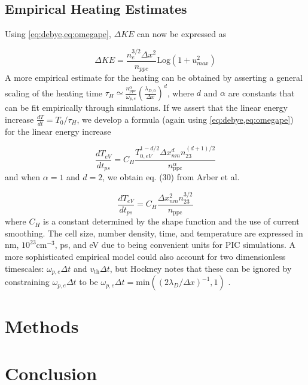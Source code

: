 \subsection{Empirical Heating Estimates}

Using \cref{eq:debye,eq:omegape}, $\Delta KE$ can now be expressed as 

\begin{equation}
	\Delta KE = \frac{n_e^{3/2} \Delta x^2}{n_{ppc}} \text{Log}(1 + u_{max}^2) \label{eq:logarber}
\end{equation}
A more empirical estimate for the heating can be obtained by asserting a general scaling of the heating time $\tau_H \simeq \frac{n_\text{ppc}^\alpha}{\omega_{p,e}} \left(\frac{\lambda_{D,0}}{\Delta x}\right)^d$, where $d$ and $\alpha$ are constants that can be fit empirically through simulations. If we assert that the linear energy increase $\frac{dT}{dt} = T_0 / \tau_H$, we develop a formula (again using \cref{eq:debye,eq:omegape}) for the linear energy increase 

\begin{equation}
	\frac{dT_{eV}}{dt_{ps}} = C_H \frac{T_{0,eV}^{1 - d/2} \Delta x_{nm}^d n_{23}^{(d + 1)/2}}{n_\text{ppc}^\alpha} \label{eq:generalizedarber}
\end{equation}
and when $\alpha = 1$ and $d = 2$, we obtain eq. (30) from Arber et al. \cite{Arber_2015_PPCF}

\begin{equation}
	\frac{dT_{eV}}{dt_{ps}} = C_H \frac{\Delta x_{nm}^2 n_{23}^{3/2}}{n_\text{ppc}} \label{eq:arber}
\end{equation}
where $C_H$ is a constant determined by the shape function and the use of current smoothing. The cell size, number density, time, and temperature are expressed in nm, $10^{23} \text{cm}^{-3}$, ps, and eV due to being convenient units for PIC simulations. A more sophisticated empirical model could also account for two dimensionless timescales: $\omega_{p, e} \Delta t$ and $v_\text{th} \Delta t$, but Hockney \cite{Hockney_1971_JoCP} notes that these can be ignored by constraining $\omega_{p,e} \Delta t$ to be $\omega_{p,e} \Delta t = \text{min}((2 \lambda_D / \Delta x)^{-1}, 1)$ \cite{Hockney_1971_JoCP}.

\section{Methods}

\section{Conclusion}
